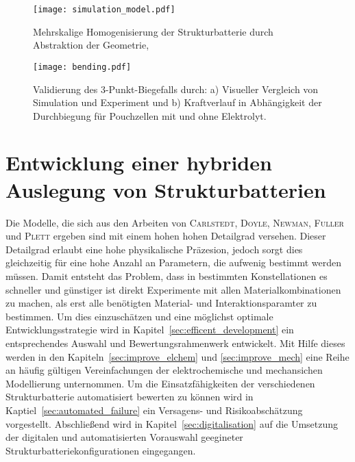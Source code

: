 \begin{figure}[!h]
        \center
		\texttt{[image: simulation\_model.pdf]}
		\caption{\label{fig:homogenisation}Mehrskalige Homogenisierung der Strukturbatterie durch Abstraktion der Geometrie, }
\end{figure}

\begin{figure}[!h]
        \center
		\texttt{[image: bending.pdf]}
		\caption{\label{fig:bending}Validierung des 3-Punkt-Biegefalls durch: a) Visueller Vergleich von Simulation und Experiment und b) Kraftverlauf in Abhängigkeit der Durchbiegung für Pouchzellen mit und ohne Elektrolyt.}
\end{figure}



\chapter{Entwicklung einer hybriden Auslegung von Strukturbatterien}
Die Modelle, die sich aus den Arbeiten von \textsc{Carlstedt}, \textsc{Doyle}, \textsc{Newman}, \textsc{Fuller} und \textsc{Plett} ergeben sind mit einem hohen hohen Detailgrad versehen. Dieser Detailgrad erlaubt eine hohe physikalische Präzesion, jedoch sorgt dies gleichzeitig für eine hohe Anzahl an Parametern, die aufwenig bestimmt werden müssen. Damit entsteht das Problem, dass in bestimmten Konstellationen es schneller und günstiger ist direkt Experimente mit allen Materialkombinationen zu machen, als erst alle benötigten Material- und Interaktionsparamter zu bestimmen. Um dies einzuschätzen und eine möglichst optimale Entwicklungsstrategie wird in Kapitel~\ref{sec:efficent_development} ein entsprechendes Auswahl und Bewertungsrahmenwerk entwickelt. Mit Hilfe dieses werden in den Kapiteln~\ref{sec:improve_elchem} und \ref{sec:improve_mech} eine Reihe an häufig gültigen Vereinfachungen der elektrochemische und mechansichen Modellierung unternommen. Um die Einsatzfähigkeiten der verschiedenen Strukturbatterie automatisiert bewerten zu können wird in Kaptiel~\ref{sec:automated_failure} ein Versagens- und Risikoabschätzung vorgestellt. Abschließend wird in Kapitel~\ref{sec:digitalisation} auf die Umsetzung der digitalen und automatisierten Vorauswahl geegineter Strukturbatteriekonfigurationen eingegangen.


